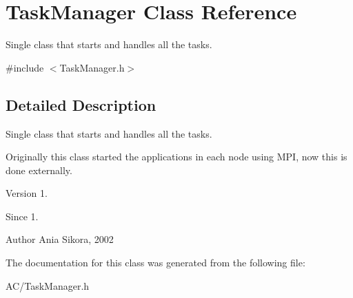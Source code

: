 \hypertarget{class_task_manager}{\section{Task\-Manager Class Reference}
\label{class_task_manager}
}


Single class that starts and handles all the tasks.  




{\ttfamily \#include $<$Task\-Manager.\-h$>$}



\subsection{Detailed Description}
Single class that starts and handles all the tasks. 

Originally this class started the applications in each node using M\-P\-I, now this is done externally.

\begin{DoxyVersion}{Version}
1. 
\end{DoxyVersion}
\begin{DoxySince}{Since}
1. 
\end{DoxySince}
\begin{DoxyAuthor}{Author}
Ania Sikora, 2002 
\end{DoxyAuthor}


The documentation for this class was generated from the following file\-:\begin{DoxyCompactItemize}
\item 
A\-C/Task\-Manager.\-h\end{DoxyCompactItemize}
